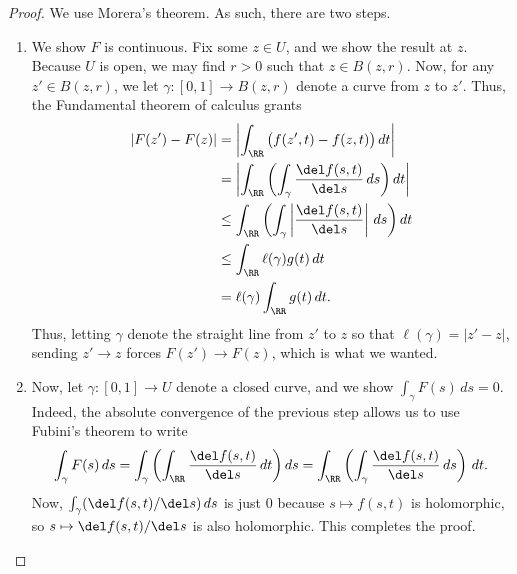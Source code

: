 \documentclass[../notes.tex]{subfiles}
\begin{document}
\begin{proof}
	We use Morera's theorem. As such, there are two steps.
	\begin{enumerate}
		\item We show $F$ is continuous. Fix some $z\in U$, and we show the result at $z$. Because $U$ is open, we may find $r>0$ such that $z\in B(z,r)$. Now, for any $z'\in B(z,r)$, we let $\gamma\colon[0,1]\to B(z,r)$ denote a curve from $z$ to $z'$. Thus, the Fundamental theorem of calculus grants
		\begin{align*}
			|F(z')-F(z)| &= \left|\int_\RR\big(f(z',t)-f(z,t)\big)\,dt\right| \\
			&= \left|\int_\RR\left(\int_\gamma\frac{\del f(s,t)}{\del s}\,ds\right)dt\right| \\
			&\le \int_\RR\left(\int_\gamma\left|\frac{\del f(s,t)}{\del s}\right|\,ds\right)dt \\
			&\le \int_\RR\ell(\gamma)g(t)\,dt \\
			&= \ell(\gamma)\int_\RR g(t)\,dt.
		\end{align*}
		Thus, letting $\gamma$ denote the straight line from $z'$ to $z$ so that $\ell(\gamma)=|z'-z|$, sending $z'\to z$ forces $F(z')\to F(z)$, which is what we wanted.
		\item Now, let $\gamma\colon[0,1]\to U$ denote a closed curve, and we show $\int_\gamma F(s)\,ds=0$. Indeed, the absolute convergence of the previous step allows us to use Fubini's theorem to write
		\[\int_\gamma F(s)\,ds=\int_\gamma\left(\int_\RR\frac{\del f(s,t)}{\del s}\,dt\right)ds=\int_\RR\left(\int_\gamma\frac{\del f(s,t)}{\del s}\,ds\right)\,dt.\]
		Now, $\int_\gamma(\del f(s,t)/\del s)\,ds$ is just $0$ because $s\mapsto f(s,t)$ is holomorphic, so $s\mapsto\del f(s,t)/\del s$ is also holomorphic. This completes the proof.
		\qedhere
	\end{enumerate}
\end{proof}
\end{document}
